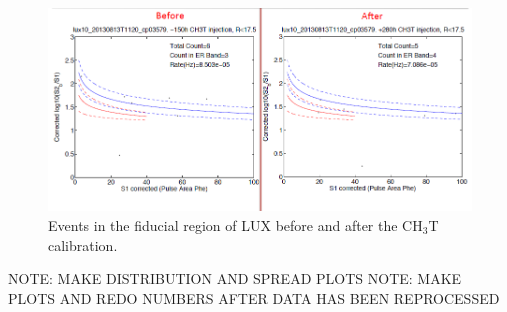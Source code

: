 \begin{figure}[h]
\centering
\includegraphics[scale=0.25]{BeforeAndAfter.png}
\caption{Events in the fiducial region of LUX before and after the CH$_3$T calibration.}
\label{fig:BandA}
\end{figure}


NOTE: MAKE DISTRIBUTION AND SPREAD PLOTS 
NOTE: MAKE PLOTS AND REDO NUMBERS AFTER DATA HAS BEEN REPROCESSED